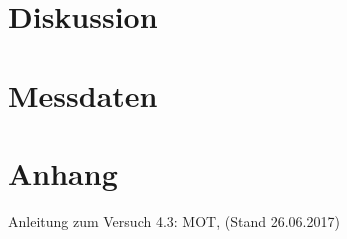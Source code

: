 \documentclass[twoside,colorback,accentcolor=tud4c,11pt]{tudreport}
\begin{document}
\chapter{Diskussion}
\chapter{Messdaten}


\chapter{Anhang}





		

\renewcommand{\bibname}{Literaturverzeichnis}
\begin{thebibliography}{Bak89}
 Anleitung zum Versuch 4.3: MOT, (Stand 26.06.2017)


\end{thebibliography} 	
\end{document}
